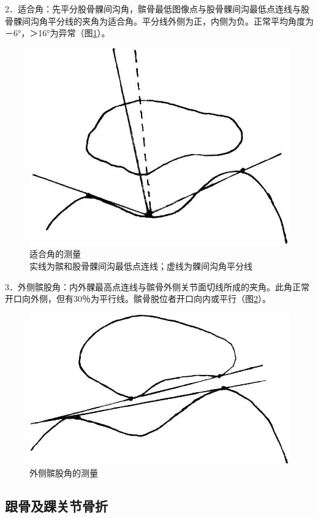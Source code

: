 2．适合角：先平分股骨髁间沟角，髌骨最低图像点与股骨髁间沟最低点连线与股骨髁间沟角平分线的夹角为适合角。平分线外侧为正，内侧为负。正常平均角度为－6°，＞16°为异常（图\ref{fig22-6}）。

\begin{figure}[!htbp]
 \centering
 \includegraphics[width=.7\textwidth,height=\textheight,keepaspectratio]{./images/Image00422.jpg}
 \captionsetup{justification=centering}
 \caption{适合角的测量\\{\small 实线为髌和股骨髁间沟最低点连线；虚线为髁间沟角平分线}}
 \label{fig22-6}
  \end{figure} 

3．外侧髌股角：内外髁最高点连线与髌骨外侧关节面切线所成的夹角。此角正常开口向外侧，但有30％为平行线。髌骨脱位者开口向内或平行（图\ref{fig22-7}）。

\begin{figure}[!htbp]
 \centering
 \includegraphics[width=.7\textwidth,height=\textheight,keepaspectratio]{./images/Image00423.jpg}
 \captionsetup{justification=centering}
 \caption{外侧髌股角的测量}
 \label{fig22-7}
  \end{figure} 

\subsection{跟骨及踝关节骨折}

